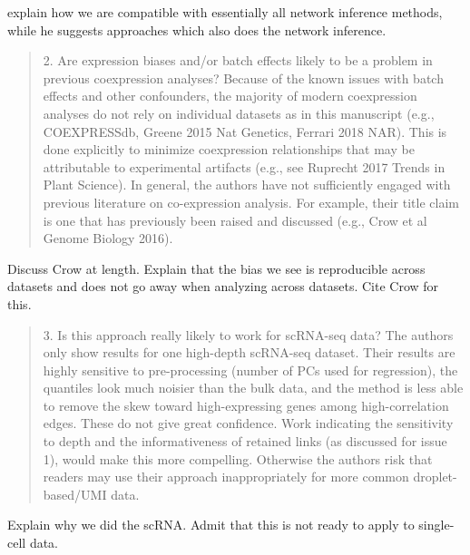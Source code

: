\documentclass[english,letterpaper,pdftex,12pt]{article}
\begin{document}
\begin{response}
  explain how we are compatible with essentially all network inference methods, while he suggests approaches which also does the network inference.
\end{response}  

\begin{quote}
2.  Are expression biases and/or batch effects likely to be a problem in previous coexpression analyses? Because of the known issues with batch effects and other confounders, the majority of modern coexpression analyses do not rely on individual datasets as in this manuscript (e.g., COEXPRESSdb, Greene 2015 Nat Genetics, Ferrari 2018 NAR). This is done explicitly to minimize coexpression relationships that may be attributable to experimental artifacts (e.g., see Ruprecht 2017 Trends in Plant Science). In general, the authors have not sufficiently engaged with previous literature on co-expression analysis. For example, their title claim is one that has previously been raised and discussed (e.g., Crow et al Genome Biology 2016). 
\end{quote}

\begin{response}
  Discuss Crow at length. Explain that the bias we see is reproducible across datasets and does not go away when analyzing across datasets. Cite Crow for this.

\end{response}  

\begin{quote}
3. Is this approach really likely to work for scRNA-seq data? The authors only show results for one high-depth scRNA-seq dataset. Their results are highly sensitive to pre-processing (number of PCs used for regression), the quantiles look much noisier than the bulk data, and the method is less able to remove the skew toward high-expressing genes among high-correlation edges. These do not give great confidence. Work indicating the sensitivity to depth and the informativeness of retained links (as discussed for issue 1), would make this more compelling. Otherwise the authors risk that readers may use their approach inappropriately for more common droplet-based/UMI data.  
\end{quote}

\begin{response}
  Explain why we did the scRNA. Admit that this is not ready to apply to single-cell data.
\end{response}  
\end{document}
